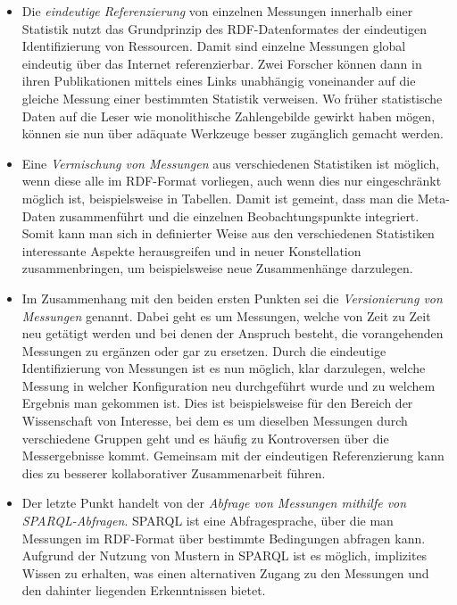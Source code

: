 \documentclass[11pt]{article}
\begin{document}
\begin{itemize}
    \item Die \textit{eindeutige Referenzierung} von einzelnen Messungen innerhalb einer Statistik nutzt das Grundprinzip des RDF-Datenformates der eindeutigen Identifizierung von Ressourcen. Damit sind einzelne Messungen global eindeutig über das Internet referenzierbar. Zwei Forscher können dann in ihren Publikationen mittels eines Links unabhängig voneinander auf die gleiche Messung einer bestimmten Statistik verweisen. Wo früher statistische Daten auf die Leser wie monolithische Zahlengebilde gewirkt haben mögen, können sie nun über adäquate Werkzeuge besser zugänglich gemacht werden.
    
    \item Eine \textit{Vermischung von Messungen} aus verschiedenen Statistiken ist möglich, wenn diese alle im RDF-Format vorliegen, auch wenn dies nur eingeschränkt möglich ist, beispielsweise in Tabellen. Damit ist gemeint, dass man die Meta-Daten zusammenführt und die einzelnen Beobachtungspunkte integriert. Somit kann man sich in definierter Weise aus den verschiedenen Statistiken interessante Aspekte herausgreifen und in neuer Konstellation zusammenbringen, um beispielsweise neue Zusammenhänge darzulegen.
    
    \item Im Zusammenhang mit den beiden ersten Punkten sei die \textit{Versionierung von Messungen} genannt. Dabei geht es um Messungen, welche von Zeit zu Zeit neu getätigt werden und bei denen der Anspruch besteht, die vorangehenden Messungen zu ergänzen oder gar zu ersetzen. Durch die eindeutige Identifizierung von Messungen ist es nun möglich, klar darzulegen, welche Messung in welcher Konfiguration neu durchgeführt wurde und zu welchem Ergebnis man gekommen ist. Dies ist beispielsweise für den Bereich der Wissenschaft von Interesse, bei dem es um dieselben Messungen durch verschiedene Gruppen geht und es häufig zu Kontroversen über die Messergebnisse kommt. Gemeinsam mit der eindeutigen Referenzierung kann dies zu besserer kollaborativer Zusammenarbeit führen. 

    \item Der letzte Punkt handelt von der \textit{Abfrage von Messungen mithilfe von SPARQL-Abfragen}. SPARQL ist eine Abfragesprache, über die man Messungen im RDF-Format über bestimmte Bedingungen abfragen kann. Aufgrund der Nutzung von Mustern in SPARQL ist es möglich, implizites Wissen zu erhalten, was einen alternativen Zugang zu den Messungen und den dahinter liegenden Erkenntnissen bietet. \cite{SPARQL-SPEC}
    
\end{itemize}
\end{document}
